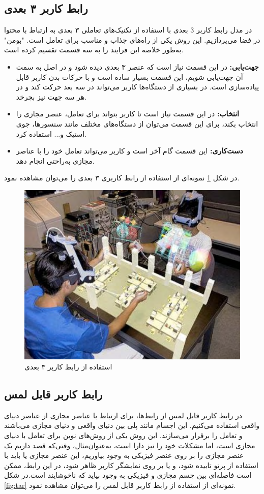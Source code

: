 \subsection{رابط کاربر ۳ بعدی}
در مدل رابط کاربر 3 بعدی با استفاده از تکنیک‌های تعاملی ۳ بعدی به ارتباط با محتوا در فضا می‌پردازیم. این روش یکی از راه‌های جذاب و مناسب برای تعامل است. "بومن" به‌طور خلاصه این فرایند را به سه قسمت تقسیم کرده است\cite{Bowman}.
\begin{itemize}
	\item 
	\textbf{
		جهت‌یابی\protect{}: }در این قسمت نیاز است که عنصر ۳ بعدی دیده شود و در اصل به سمت آن جهت‌یابی شویم، این قسمت بسیار ساده است و با حرکات بدن کاربر قابل پیاده‌سازی است. در بسیاری از دستگاه‌ها کاربر می‌تواند در سه بعد حرکت کند و در هر سه جهت نیز بچرخد.
	\item 
	\textbf{
		انتخاب:} در این قسمت نیاز است تا کاربر بتواند برای تعامل، عنصر مجازی را انتخاب بکند، برای این قسمت می‌توان از دستگاه‌های مختلف مانند سنسورها، جوی استیک و... استفاده کرد.
	\item 
	\textbf{
		دست‌کاری:} این قسمت گام آخر است و کاربر می‌تواند تعامل خود را با عناصر مجازی به‌راحتی انجام دهد.
\end{itemize}
در شکل \ref{fig:Bowman} نمونه‌ای از استفاده از رابط کاربری ۳ بعدی را می‌توان مشاهده نمود.
\begin{figure}[tb]
	\centering
	\includegraphics[width=0.6\linewidth]{image/3d}
	\caption {استفاده از رابط کاربر ۳ بعدی \cite{Bowman}}
	\label{fig:Bowman}
\end{figure}
\subsection{رابط کاربر قابل‌ لمس}
در رابط کاربر قابل‌ لمس از رابط‌ها، برای ارتباط با عناصر مجازی از عناصر دنیای واقعی استفاده می‌کنیم. این اجسام مانند پلی بین دنیای واقعی و دنیای مجازی می‌باشند و تعامل را برقرار می‌سازند. این روش یکی از روش‌های نوین برای تعامل با دنیای مجازی است، اما مشکلات خود را نیز دارا است، به‌عنوان‌مثال، وقتی‌که قصد داریم یک عنصر مجازی را بر روی عنصر فیزیکی به وجود بیاوریم، این عنصر مجازی یا باید با استفاده از پرتو تابیده شود، و یا بر روی نمایشگر کاربر ظاهر شود، در این رابط، ممکن است فاصله‌ای بین جسم مجازی و فیزیکی به وجود بیاید که ناخوشایند است\cite{Kato}.در شکل \ref{fig:tar} نمونه‌ای از استفاده از رابط کاربر قابل لمس را می‌توان مشاهده نمود.

